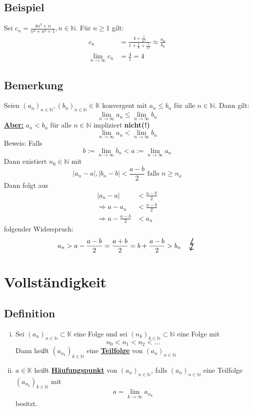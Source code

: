 \subsection{Beispiel} %
\label{sub:beispiel}
Sei $c_n = \frac{4 n^3 +n}{n^3 +n^2 +1} , n \in \mathds{N} $. Für $n \geq 1$ gilt:
	\begin{align*}
		c_n &= \frac{4 + \frac{1}{n^2}}{1 + \frac{1}{n} + \frac{1}{n^3}} 
		\approx \frac{a_n}{b_n} \\
		\lim\limits_{n \to \infty} c_n &= \frac{4}{1} = 4
	\end{align*}

\subsection{Bemerkung} %
\label{sub:bemerkung}
Seien $(a_n)_{n \in \mathds{N}}, (b_n)_{n \in \mathds{N}} \in \mathds{K}$ konvergent mit 
$a_n \leq b_n$ für alle $n \in \mathds{N}$. Dann gilt:
\[
	\lim\limits_{n \to \infty} a_n \leq \lim\limits_{n \to \infty} b_n
\]
\underline{\textbf{Aber:}} $a_n < b_n$ für alle $n \in \mathds{N}$ impliziert \textbf{nicht(!)}
\[
	\lim\limits_{n \to \infty} a_n < \lim\limits_{n \to \infty} b_n
\]
Beweis: Falls 
\[
	b:= \lim\limits_{n \to \infty} b_n < a:= \lim\limits_{n \to \infty} a_n
\]
Dann existiert $n_0 \in \mathds{N}$ mit
\[
	|a_n -a|, |b_n -b| < \frac{a-b}{2} \text{ falls } n \geq n_o
\]
Dann folgt aus 
\begin{align*}
	|a_n -a| &< \frac{a-b}{2} \\
	\Rightarrow a-a_n &< \frac{a-b}{2} \\
	\Rightarrow a- \frac{a-b}{2} &< a_n
\end{align*}
folgender Widerspruch:
\[
	a_n > a- \frac{a-b}{2} = \frac{a+b}{2} = b + \frac{a-b}{2} > b_n \quad \text{\huge $\lightning$}
\]

\section{Vollständigkeit} %
\label{sec:vollständigkeit}

\subsection{Definition} %
\label{sub:definition}
\begin{enumerate}[(i)]
	\item Sei $(a_n)_{n \in \mathds{N}} \subset \mathds{K}$ eine Folge 
	und sei $(n_k)_{k \in \mathds{N}} \subset \mathds{N}$ eine Folge mit 
	\[
		n_0 < n_1 < n_2 < \ldots 
	\]
	Dann heißt $(a_{n_k})_{k \in \mathds{N}}$ eine \underline{\textbf{Teilfolge}} von $(a_n)_{n \in \mathds{N}}$
	\item $a \in \mathds{K}$ heißt \underline{\textbf{Häufungspunkt}} von $(a_n)_{n \in \mathds{N}}$, falls $(a_n)_{n \in \mathds{N}}$
	eine Teilfolge $(a_{n_k})_{k \in \mathds{N}}$ mit 
	\[
		a = \lim\limits_{k \to \infty} a_{n_k}
	\]
	besitzt.
\end{enumerate}

